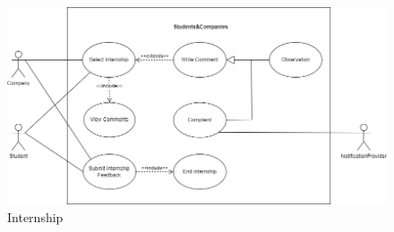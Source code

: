 \documentclass{article}
\begin{document}
\begin{figure}[H]
    \centering
    \includegraphics[scale = 0.45]{figures/UseCasesDiagrams/InternshipUC.drawio.png}
    \caption{Internship}
    \centering
\end{figure}
\newpage
\end{document}

